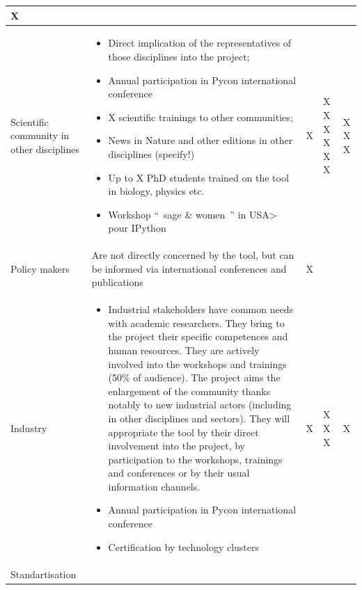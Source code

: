 \begin{flushleft}
\begin{supertabular}{|m{2.7949998cm}|m{10.711cm}|m{1.0489999cm}|m{1.301cm}|m{1.163cm}|}
X\\\hline
Scientific community in other disciplines &
\begin{itemize}
\item Direct implication of the representatives of those disciplines
into the project;\item Annual participation in Pycon international
conference\item X scientific trainings to other communities; \item News
in Nature and other editions in other disciplines (specify!)\item Up to
X PhD students trained on the tool in biology, physics etc.\item
Workshop ``~sage \& women~'' in USA{\textgreater} pour
IPython\end{itemize}
 &
X
 &
X
X
X
X
X
X
 &
X
X
X\\\hline
Policy makers &
Are not directly concerned by the tool, but can be informed via
international conferences and publications &
X &
 &
\\\hline
Industry &
\begin{itemize}
\item Industrial stakeholders have common needs with academic
researchers. They bring to the project their specific competences and
human resources. They are actively involved into the workshops and
trainings (50\% of audience). The project aims the enlargement of the
community thanks notably to new industrial actors (including in other
disciplines and sectors). They will appropriate the tool by their
direct involvement into the project, by participation to the workshops,
trainings and conferences or by their usual information channels.\item
Annual participation in Pycon international conference\item
Certification by technology clusters\end{itemize}
 &
X &
X
X
X
 &
X\\\hline
Standartisation


\end{supertabular}
\end{flushleft}
